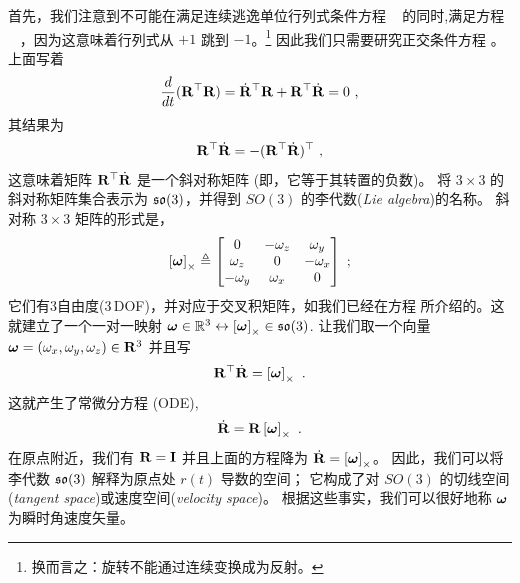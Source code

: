 首先，我们注意到不可能在满足连续逃逸单位行列式条件方程 ~ 的同时,满足方程 ~ ，因为这意味着行列式从 $+1$ 跳到 $-1$。\footnote{换而言之：旋转不能通过连续变换成为反射。}
因此我们只需要研究正交条件方程  。上面写着
%
\begin{align}
\frac{d}{dt}{({\bf R}^{\top}{\bf R})} = \dot{{\bf R}}^{\top}{\bf R}+{\bf R}^{\top}\dot{{\bf R}} = 0
~,
\end{align}
%
其结果为
%
\begin{align}
{\bf R}^{\top}\dot{{\bf R}} 
= -({\bf R}^{\top}\dot{{\bf R}})^{\top}
~,
\end{align}
%
这意味着矩阵 ${\bf R}^{\top}\dot{{\bf R}}$ 是一个斜对称矩阵 (即，它等于其转置的负数)。 
将 $3\times3$ 的斜对称矩阵集合表示为 ${\mathfrak {so}}(3)$，并得到 $SO(3)$ 的李代数(\emph{Lie algebra})的名称。
斜对称 $3\times3$ 矩阵的形式是，
%
\begin{align}
\left[{\bm \omega}\right]_\times \triangleq \begin{bmatrix}
0 & -\omega_z & \omega_y \\
\omega_z & 0 & -\omega_x \\
-\omega_y & \omega_x & 0
\end{bmatrix}
~;
\end{align}
%
它们有3自由度(3\,DOF)，并对应于交叉积矩阵，如我们已经在方程  所介绍的。这就建立了一个一对一映射 ${\bm \omega}\in{\mathbb R}^3\leftrightarrow\left[{\bm \omega}\right]_\times\in{\mathfrak {so}}(3)$.
%
让我们取一个向量 ${\bm \omega}=(\omega_x,\omega_y,\omega_z)\in{\bf R}^3$ 并且写
%
\begin{align}
{\bf R}^{\top}\dot{{\bf R}} = \left[{\bm \omega}\right]_\times
~.
\end{align}
%
这就产生了常微分方程 (ODE),
%
\begin{align}
\label{equ:Rdot}
\dot{{\bf R}}={\bf R}\left[{\bm \omega}\right]_\times~.
\end{align}
%
在原点附近，我们有 ${\bf R}={\bf I}$ 并且上面的方程降为 $\dot{{\bf R}}=\left[{\bm \omega}\right]_\times$。
因此，我们可以将李代数 ${\mathfrak {so}}(3)$ 解释为原点处 $r(t)$ 导数的空间；
它构成了对 $SO(3)$ 的切线空间(\emph{tangent space})或速度空间(\emph{velocity space})。
根据这些事实，我们可以很好地称 ${\bm \omega}$ 为瞬时角速度矢量。 

